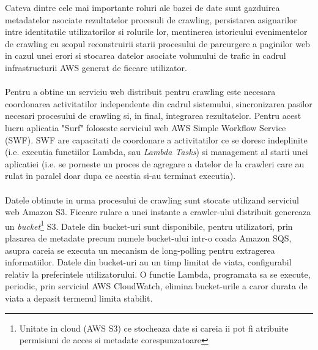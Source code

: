 \noindent
Cateva dintre cele mai importante roluri ale bazei de date sunt gazduirea metadatelor asociate rezultatelor procesuli de crawling, persistarea asignarilor intre identitatile utilizatorilor si rolurile lor, mentinerea istoricului evenimentelor de crawling cu scopul reconstruirii starii procesului de parcurgere a paginilor web in cazul unei erori si stocarea datelor asociate volumului de trafic in cadrul infrastructurii AWS generat de fiecare utilizator.
\\
\\
Pentru a obtine un serviciu web distribuit pentru crawling este necesara coordonarea activitatilor independente din cadrul sistemului, sincronizarea pasilor necesari procesului de crawling si, in final, integrarea rezultatelor. Pentru acest lucru aplicatia "Surf" foloseste serviciul web AWS Simple Workflow Service (SWF). SWF  are capacitati de coordonare a activitatilor ce se doresc indeplinite (i.e. executia functiilor Lambda, sau \emph{Lambda Tasks}) si management al starii unei aplicatiei (i.e. se porneste un proces de agregare a datelor de la crawleri care au rulat in paralel doar dupa ce acestia si-au terminat executia).
\\
\\
Datele obtinute in urma procesului de crawling sunt stocate utilizand serviciul web Amazon S3. Fiecare rulare a unei instante a crawler-ului distribuit genereaza un \emph{bucket}\footnote{Unitate in cloud (AWS S3) ce stocheaza date si careia ii pot fi atribuite permisiuni de acces si metadate corespunzatoare} S3. Datele din bucket-uri sunt disponibile, pentru utilizatori, prin plasarea de metadate precum numele bucket-ului intr-o coada Amazon SQS, asupra careia se executa un mecanism de long-polling pentru extragerea informatiilor. Datele din bucket-uri au un timp limitat de viata, configurabil relativ la preferintele utilizatorului.   O functie Lambda, programata sa se execute, periodic, prin serviciul AWS CloudWatch, elimina bucket-urile a caror durata de viata a depasit termenul limita stabilit.

